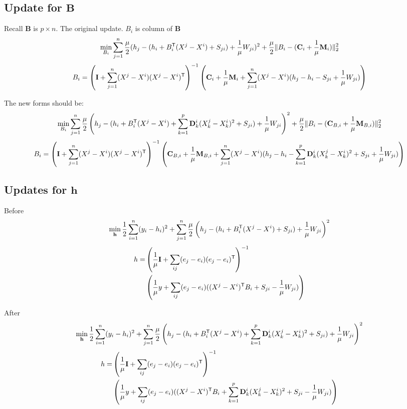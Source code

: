 \documentclass{article}
\begin{document}
\subsection{Update for $\mathbf{B}$}

Recall $\mathbf{B}$ is $p\times n$. The original update. $B_i$ is column of $\mathbf{B}$
\[
\min_{B_i} \sum_{j=1}^n \frac{\mu}{2} (h_j - (h_i + B_i^{\mathsf{T}} (X^j - X^i) + S_{ji} ) + \frac{1}{\mu}W_{ji})^2 + \frac{\mu}{2} \| B_i - (\mathbf{C}_i + \frac{1}{\mu} \mathbf{M}_i) \|_2^2
\]
\[
B_i = \left( \mathbf{I} + \sum_{j=1}^n (X^j - X^i)(X^j - X^i)^{\mathsf{T}} \right)^{-1} 
	\left( \mathbf{C}_i + \frac{1}{\mu}\mathbf{M}_i + \sum_{j=1}^n (X^j - X^i)(h_j - h_i - S_{ji} + \frac{1}{\mu} W_{ji}) \right)
\]

The new forms should be:
\[
\min_{B_i} \sum_{j=1}^n \frac{\mu}{2} \left(h_j - (h_i + B_i^{\mathsf{T}} (X^j - X^i) + \sum_{k=1}^p \mathbf{D}^i_k (X^j_k - X^i_k)^2 + S_{ji} ) + \frac{1}{\mu}W_{ji}\right)^2 + \frac{\mu}{2} \| B_i - (\mathbf{C}_{B, i} + \frac{1}{\mu} \mathbf{M}_{B,i}) \|_2^2
\]
\[
B_i = \left( \mathbf{I} + \sum_{j=1}^n (X^j - X^i)(X^j - X^i)^{\mathsf{T}} \right)^{-1} 
	\left( \mathbf{C}_{B,i} + \frac{1}{\mu}\mathbf{M}_{B,i} + \sum_{j=1}^n (X^j - X^i)(h_j - h_i - \sum_{k=1}^p \mathbf{D}^i_k (X^j_k - X^i_k)^2+ S_{ji} + \frac{1}{\mu} W_{ji}) \right)
\]

\subsection{Updates for $\mathbf{h}$}

Before
\[
\min_{\mathbf{h}} \frac{1}{2} \sum_{i=1}^n (y_i - h_i)^2 + \sum_{j=1}^n \frac{\mu}{2} \left(h_j - (h_i + B_i^{\mathsf{T}} (X^j - X^i) + S_{ji} ) + \frac{1}{\mu}W_{ji}\right)^2
\]
\begin{align*}
h = & \left( \frac{1}{\mu} \mathbf{I} + \sum_{ij} (e_j - e_i)(e_j - e_i)^{\mathsf{T}}\right)^{-1} \\
	& \left( \frac{1}{\mu} y + \sum_{ij} (e_j - e_i)((X^j - X^i)^{\mathsf{T}} B_i + S_{ji} - \frac{1}{\mu} W_{ji} )\right)
\end{align*}

After
\[
\min_{\mathbf{h}} \frac{1}{2} \sum_{i=1}^n (y_i - h_i)^2 + \sum_{j=1}^n \frac{\mu}{2} \left(h_j - (h_i + B_i^{\mathsf{T}} (X^j - X^i) + \sum_{k=1}^p \mathbf{D}^i_k (X^j_k - X^i_k)^2 + S_{ji} ) + \frac{1}{\mu}W_{ji}\right)^2
\]
\begin{align*}
h = & \left( \frac{1}{\mu} \mathbf{I} + \sum_{ij} (e_j - e_i)(e_j - e_i)^{\mathsf{T}}\right)^{-1} \\
	& \left( \frac{1}{\mu} y + \sum_{ij} (e_j - e_i)((X^j - X^i)^{\mathsf{T}} B_i + \sum_{k=1}^p \mathbf{D}^i_k (X^j_k - X^i_k)^2 + S_{ji} - \frac{1}{\mu} W_{ji} )\right)
\end{align*}
\end{document}
